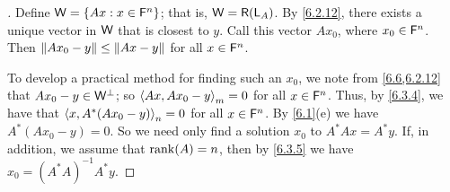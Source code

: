 \begin{proof}[]
  Define \(\mathsf{W} = \left\lbrace Ax : x \in \mathsf{F}^n\right\rbrace\);
  that is, \(\W = \rg{\L_A}\).
  By \cref{6.2.12}, there exists a unique vector in \(\mathsf{W}\) that is closest to \(y\).
  Call this vector \(A x_0\), where \(x_0 \in \mathsf{F}^n\).
  Then \(\left\lVert A x_0 - y\right\rVert \leq \left\lVert Ax - y\right\rVert\) for all \(x \in \mathsf{F}^n\).

  To develop a practical method for finding such an \(x_0\), we note from \cref{6.6,6.2.12} that \(A x_0 - y \in \mathsf{W}^{\perp}\);
  so \(\left\langle Ax, A x_0 - y\right\rangle_m = 0\) for all \(x \in \mathsf{F}^n\).
  Thus, by \cref{6.3.4}, we have that \(\left\langle x, A^* (A x_0 - y)\right\rangle_n = 0\) for all \(x \in \mathsf{F}^n\).
  By \cref{6.1}(e) we have \(A^* (A x_0 - y) = 0\).
  So we need only find a solution \(x_0\) to \(A^* Ax = A^* y\).
  If, in addition, we assume that \(\rk{A} = n\), then by \cref{6.3.5} we have \(x_0 = (A^* A)^{-1} A^* y\).
\end{proof}


